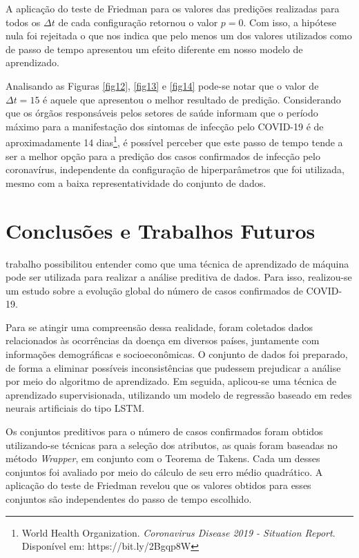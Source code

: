 \documentclass{ieeeaccess}
\begin{document}
A aplicação do teste de Friedman para os valores das predições realizadas para todos os $\Delta t$ de cada configuração retornou o valor $p = 0$. Com isso, a hipótese nula foi rejeitada o que nos indica que pelo menos um dos valores utilizados como de passo de tempo apresentou um efeito diferente em nosso modelo de aprendizado. 

Analisando as Figuras \ref{fig12}, \ref{fig13} e \ref{fig14}  pode-se notar que o valor de $\Delta t = 15$ é aquele que apresentou o melhor resultado de predição. Considerando que os órgãos responsáveis pelos setores de saúde informam que o período máximo para a manifestação dos sintomas de infecção pelo COVID-19 é de aproximadamente 14 dias\footnote{World Health Organization. \textit{Coronavirus Disease 2019 - Situation Report}. Disponível em: https://bit.ly/2Bgqp8W}, é possível perceber que este passo de tempo tende a ser a melhor opção para a predição dos casos confirmados de infecção pelo coronavírus, independente da configuração de hiperparâmetros que foi utilizada, mesmo com a baixa representatividade do conjunto de dados. 

\section{Conclusões e Trabalhos Futuros}

\label{sec:introduction}  trabalho possibilitou entender como que uma técnica de aprendizado de máquina pode ser utilizada para realizar a análise preditiva de dados. Para isso, realizou-se um estudo sobre a evolução global do número de casos confirmados de COVID-19.

Para se atingir uma compreensão dessa realidade, foram coletados dados relacionados às ocorrências da doença em diversos países, juntamente com informações demográficas e socioeconômicas. O conjunto de dados foi preparado, de forma a eliminar possíveis inconsistências que pudessem prejudicar a análise por meio do algoritmo de aprendizado. Em seguida, aplicou-se uma técnica de aprendizado supervisionada, utilizando um modelo de regressão baseado em redes neurais artificiais do tipo LSTM.

Os conjuntos preditivos para o número de casos confirmados foram obtidos utilizando-se técnicas para a seleção dos atributos, as quais foram baseadas no método \textit{Wrapper}, em conjunto com o Teorema de Takens. Cada um desses conjuntos foi avaliado por meio do cálculo de seu erro médio quadrático. A aplicação do teste de Friedman revelou que os valores obtidos para esses conjuntos são independentes do passo de tempo escolhido.
\end{document}
